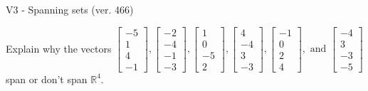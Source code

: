 \begin{exercise}
  \begin{exerciseTitle}V3 - Spanning sets (ver. 466)\end{exerciseTitle}
  \begin{exerciseStatement}
    Explain why the vectors \(\left[\begin{array}{r}
-5 \\
1 \\
4 \\
-1
\end{array}\right] , \left[\begin{array}{r}
-2 \\
-4 \\
-1 \\
-3
\end{array}\right] , \left[\begin{array}{r}
1 \\
0 \\
-5 \\
2
\end{array}\right] , \left[\begin{array}{r}
4 \\
-4 \\
3 \\
-3
\end{array}\right] , \left[\begin{array}{r}
-1 \\
0 \\
2 \\
4
\end{array}\right] , \text{ and } \left[\begin{array}{r}
-4 \\
3 \\
-3 \\
-5
\end{array}\right]\) span or don't span \(\mathbb{R}^4\). 
	



\end{exerciseStatement}
\end{exercise}
